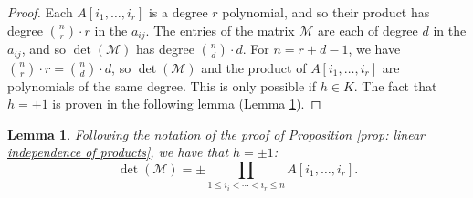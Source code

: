 \documentclass [a4paper,reqno, 11pt]{amsart}
\theoremstyle{plain}
\theoremstyle{plain}
\theoremstyle{plain}
\theoremstyle{plain}
\newtheorem{lemma}[theorem]{Lemma}
\theoremstyle{definition}
\theoremstyle{definition}
\theoremstyle{definition}
\theoremstyle{definition}
\theoremstyle{definition}
\theoremstyle{definition}
\begin{document}
\begin{proof}
Each $A[i_1,\ldots, i_r]$ is a degree $r$ polynomial, and so their product has degree $\binom{n}{r}\cdot r$ in the $a_{ij}$.
The entries of the matrix \(\mathcal{M}\) are each of degree \(d\) in the \(a_{ij}\), and so \(\det(\mathcal{M})\) has degree \(\binom{n}{d}\cdot d\). For \(n=r+d-1\), we have \(\binom{n}{r}\cdot r=\binom{n}{d}\cdot d\), so \(\det(\mathcal{M})\) and the product of $A[i_1,\ldots, i_r]$ are polynomials of the same degree. This is only possible if \(h\in K\). The fact that $h=\pm 1$ is proven in the
following lemma (Lemma \ref{lem:LT-generic}).
\end{proof}

\begin{lemma}\label{lem:LT-generic}
    Following the notation of the proof of Proposition \ref{prop: linear independence of products}, we have that $h=\pm 1$:
    \begin{equation}\label{eqn:lem-LT}
        \det(\mathcal{M})=\pm\prod_{1\leq i_i<\cdots<i_r\leq n}A[i_1,\ldots, i_r].
    \end{equation}\
\end{lemma}
\end{document}

